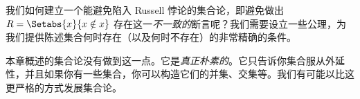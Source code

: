 \documentclass[../../../include/open-logic-section]{subfiles}
\begin{document}
\begin{digress}
我们如何建立一个能避免陷入 Russell 悖论的集合论，即避免做出 $R = \Setabs{x}{x \notin x}$ 存在这一\emph{不一致的}断言呢？我们需要设立一些公理，为我们提供陈述集合何时存在（以及何时不存在）的非常精确的条件。

本章概述的集合论没有做到这一点。它是\emph{真正朴素的}。它只告诉你集合服从外延性，并且如果你有一些集合，你可以构造它们的并集、交集等。我们有可能以比这更严格的方式发展集合论。 
\end{digress}
\end{document}
